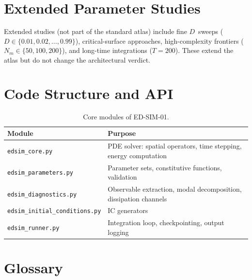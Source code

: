 \documentclass[11pt,twoside,openright]{book}
\theoremstyle{definition}
\theoremstyle{plain}
\theoremstyle{definition}
\theoremstyle{remark}
\begin{document}
\chapter{Extended Parameter Studies}\label{app:extended}

Extended studies (not part of the standard atlas) include fine \(D\)~sweeps (\(D \in \{0.01, 0.02, \ldots, 0.99\}\)), critical-surface approaches, high-complexity frontiers (\(N_m \in \{50, 100, 200\}\)), and long-time integrations (\(T = 200\)). These extend the atlas but do not change the architectural verdict.


\chapter{Code Structure and API}\label{app:code}

\begin{table}[ht]
\centering
\caption{Core modules of ED-SIM-01.}\label{tab:modules}
\begin{tabular}{@{}lp{7cm}@{}}
\toprule
Module & Purpose \\
\midrule
\texttt{edsim\_core.py}       & PDE solver: spatial operators, time stepping, energy computation \\
\texttt{edsim\_parameters.py} & Parameter sets, constitutive functions, validation \\
\texttt{edsim\_diagnostics.py}& Observable extraction, modal decomposition, dissipation channels \\
\texttt{edsim\_initial\_conditions.py} & IC generators \\
\texttt{edsim\_runner.py}     & Integration loop, checkpointing, output logging \\
\bottomrule
\end{tabular}
\end{table}


\chapter{Glossary}\label{app:glossary}
\end{document}
